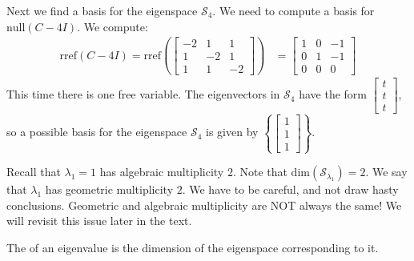 \documentclass{ximera}
\begin{document}
\begin{example}
\begin{explanation}
Next we find a basis for the eigenspace $\mathcal{S}_4$.  We need to compute a basis for $\mbox{null}(C-4I)$.  We compute:
\begin{align*}\mbox{rref}(C-4I)=\mbox{rref}\left(\begin{bmatrix} -2 & 1 & 1\\ 1 & -2 & 1\\ 1 & 1 & -2\end{bmatrix}\right)&=\begin{bmatrix} 1 & 0 & -1\\ 0 & 1 & -1\\ 0 & 0 & 0\end{bmatrix}
\end{align*}
This time there is one free variable.  %
The eigenvectors in $\mathcal{S}_4$ have the form $\begin{bmatrix}t\\t\\t\end{bmatrix}$, so a possible basis for the eigenspace $\mathcal{S}_4$ is given by $\left\{\begin{bmatrix}1\\1\\1\end{bmatrix}\right\}$.

\begin{remark}
    Recall that $\lambda_1=1$ has algebraic multiplicity $2$.  Note that $\text{dim}(\mathcal{S}_{\lambda_1})=2$.  We say that  $\lambda_1$ has geometric multiplicity $2$.  We have to be careful, and not draw hasty conclusions. Geometric and algebraic multiplicity are NOT always the same!  We will revisit this issue later in the text.
\end{remark}

\end{explanation}
\end{example}

\begin{definition}\label{def:geomMult}
    The  of an eigenvalue is the dimension of the eigenspace corresponding to it.
\end{definition}
\end{document}
